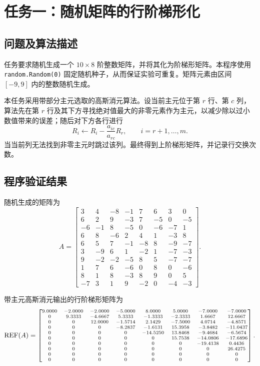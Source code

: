 \documentclass[UTF8,zihao=-4]{ctexart}
\begin{document}
\section{任务一：随机矩阵的行阶梯形化}

\subsection{问题及算法描述}

任务要求随机生成一个 $10\times 8$ 阶整数矩阵，并将其化为阶梯形矩阵。本程序使用 \texttt{random.Random(0)} 固定随机种子，从而保证实验可重复。矩阵元素由区间 $[-9,9]$ 内的整数随机生成。

本任务采用带部分主元选取的高斯消元算法。设当前主元位于第 $r$ 行、第 $c$ 列，算法先在第 $r$ 行及其下方寻找绝对值最大的非零元素作为主元，以减少除以过小数值带来的误差；随后对下方各行进行
\[
    R_i \leftarrow R_i-\frac{a_{ic}}{a_{rc}}R_r,\qquad i=r+1,\ldots,m.
\]
当当前列无法找到非零主元时跳过该列。最终得到上阶梯形矩阵，并记录行交换次数。

\subsection{程序验证结果}

随机生成的矩阵为
\[
A=\begin{bmatrix}
3&4&-8&-1&7&6&3&0\\
6&2&9&-3&7&-5&0&-5\\
-6&-1&8&-5&0&-6&-7&1\\
6&8&-6&2&4&1&-3&8\\
6&5&7&-1&-8&8&-9&-7\\
3&-9&6&1&-2&1&-7&-3\\
9&-2&-2&-5&8&5&-7&-7\\
1&7&6&-6&0&8&0&-6\\
8&1&8&-3&8&9&0&5\\
-7&3&1&9&-2&0&-4&-3
\end{bmatrix}.
\]

带主元高斯消元输出的行阶梯形矩阵为
\[
\scriptsize
\operatorname{REF}(A)=\begin{bmatrix}
9.0000&-2.0000&-2.0000&-5.0000&8.0000&5.0000&-7.0000&-7.0000\\
0&9.3333&-4.6667&5.3333&-1.3333&-2.3333&1.6667&12.6667\\
0&0&12.0000&-1.5714&2.1429&-7.5000&4.0714&-4.8571\\
0&0&0&-8.2837&-1.6131&15.3958&-3.8482&-11.0437\\
0&0&0&0&-14.5250&13.8468&-9.4684&-6.5674\\
0&0&0&0&0&15.7538&-14.0806&-17.6896\\
0&0&0&0&0&0&-19.4138&0.4436\\
0&0&0&0&0&0&0&26.4275\\
0&0&0&0&0&0&0&0\\
0&0&0&0&0&0&0&0
\end{bmatrix}.
\]
\end{document}
